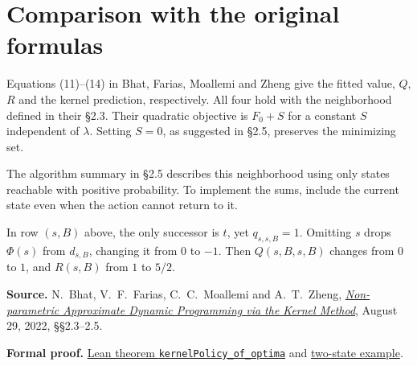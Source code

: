 \documentclass[12pt,a4paper]{article}
\begin{document}
\section*{Comparison with the original formulas}
Equations (11)--(14) in Bhat, Farias, Moallemi and Zheng give the fitted
value, \(Q\), \(R\) and the kernel prediction, respectively. All four
hold with the neighborhood defined in their \S2.3. Their quadratic
objective is \(F_0+S\) for a constant \(S\) independent of \(\lambda\).
Setting \(S=0\), as suggested in \S2.5, preserves the minimizing set.

The algorithm summary
in \S2.5 describes this neighborhood using only states reachable with
positive probability. To implement the sums, include the current state
even when the action cannot return to it.

In row \((s,B)\) above, the only successor is \(t\), yet \(q_{s,s,B}=1\).
Omitting \(s\) drops \(\Phi(s)\) from \(d_{s,B}\), changing it from \(0\)
to \(-1\). Then \(Q(s,B,s,B)\) changes from \(0\) to \(1\), and \(R(s,B)\)
from \(1\) to \(5/2\).

\smallskip
{\small
\textbf{Source.} N.~Bhat, V.~F.~Farias, C.~C.~Moallemi and A.~T.~Zheng,
\href{https://moallemi.com/ciamac/papers/kernel-adp-2012.pdf\#page=7}{\emph{Non-parametric Approximate Dynamic Programming via the Kernel Method}},
August 29, 2022, \S\S2.3--2.5.\par
\textbf{Formal proof.}
\href{https://github.com/nikhilpb/kadp/blob/main/Kadp/KernelPolicy.lean}{Lean theorem \texttt{kernelPolicy\_of\_optima}}
and \href{https://github.com/nikhilpb/kadp/blob/main/Kadp/Examples/KernelPolicy.lean}{two-state example}.}
\end{document}
